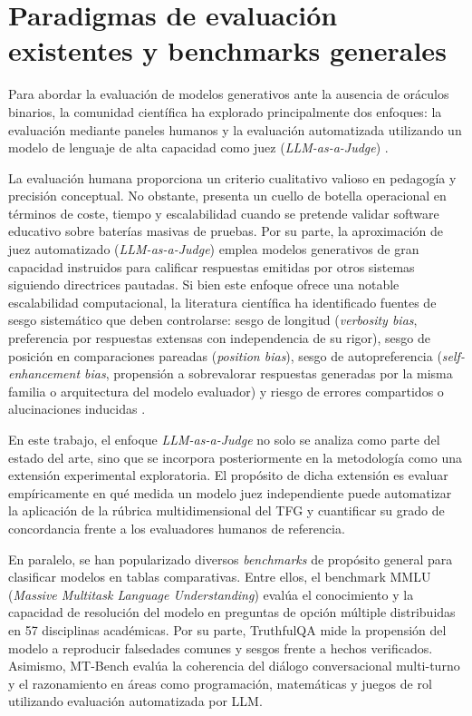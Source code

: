 \section{Paradigmas de evaluación existentes y benchmarks generales}
\label{sec:evaluacion_respuestas}
Para abordar la evaluación de modelos generativos ante la ausencia de oráculos binarios, la comunidad científica ha explorado principalmente dos enfoques: la evaluación mediante paneles humanos y la evaluación automatizada utilizando un modelo de lenguaje de alta capacidad como juez (\textit{LLM-as-a-Judge}) \cite{zheng2023judging}.

La evaluación humana proporciona un criterio cualitativo valioso en pedagogía y precisión conceptual. No obstante, presenta un cuello de botella operacional en términos de coste, tiempo y escalabilidad cuando se pretende validar software educativo sobre baterías masivas de pruebas. Por su parte, la aproximación de juez automatizado (\textit{LLM-as-a-Judge}) emplea modelos generativos de gran capacidad instruidos para calificar respuestas emitidas por otros sistemas siguiendo directrices pautadas. Si bien este enfoque ofrece una notable escalabilidad computacional, la literatura científica ha identificado fuentes de sesgo sistemático que deben controlarse: sesgo de longitud (\textit{verbosity bias}, preferencia por respuestas extensas con independencia de su rigor), sesgo de posición en comparaciones pareadas (\textit{position bias}), sesgo de autopreferencia (\textit{self-enhancement bias}, propensión a sobrevalorar respuestas generadas por la misma familia o arquitectura del modelo evaluador) y riesgo de errores compartidos o alucinaciones inducidas \cite{zheng2023judging}.

En este trabajo, el enfoque \textit{LLM-as-a-Judge} no solo se analiza como parte del estado del arte, sino que se incorpora posteriormente en la metodología como una extensión experimental exploratoria. El propósito de dicha extensión es evaluar empíricamente en qué medida un modelo juez independiente puede automatizar la aplicación de la rúbrica multidimensional del TFG y cuantificar su grado de concordancia frente a los evaluadores humanos de referencia.

En paralelo, se han popularizado diversos \textit{benchmarks} de propósito general para clasificar modelos en tablas comparativas. Entre ellos, el benchmark MMLU (\textit{Massive Multitask Language Understanding}) \cite{hendrycks2021mmlu} evalúa el conocimiento y la capacidad de resolución del modelo en preguntas de opción múltiple distribuidas en 57 disciplinas académicas. Por su parte, TruthfulQA \cite{lin2022truthfulqa} mide la propensión del modelo a reproducir falsedades comunes y sesgos frente a hechos verificados. Asimismo, MT-Bench \cite{zheng2023judging} evalúa la coherencia del diálogo conversacional multi-turno y el razonamiento en áreas como programación, matemáticas y juegos de rol utilizando evaluación automatizada por LLM.

